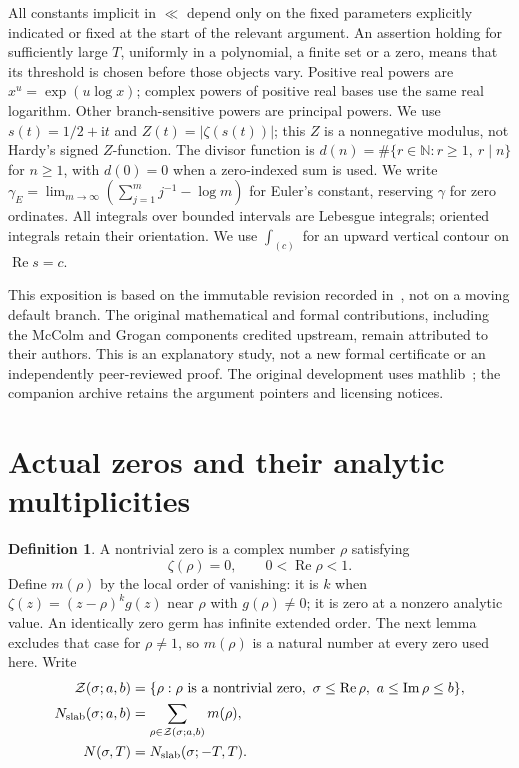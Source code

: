 \documentclass[11pt,a4paper]{article}
\numberwithin{equation}{section}
\theoremstyle{definition}
\newtheorem{definition}[theorem]{Definition}
\newcommand{\N}{\mathbb N}
\newcommand{\ii}{\mathrm i}
\newcommand{\Rea}{\operatorname{Re}}
\newcommand{\Ima}{\operatorname{Im}}
\begin{document}
All constants implicit in $\ll$ depend only on the fixed parameters
explicitly indicated or fixed at the start of the relevant argument.
An assertion holding for sufficiently large $T$, uniformly in a polynomial,
a finite set or a zero, means that its threshold is chosen before those
objects vary. Positive real powers are $x^u=\exp(u\log x)$; complex powers
of positive real bases use the same real logarithm. Other branch-sensitive
powers are principal powers. We use $s(t)=1/2+\ii t$ and
$Z(t)=|\zeta(s(t))|$; this $Z$ is a nonnegative modulus, not Hardy's signed
$Z$-function. The divisor function is
$d(n)=\#\{r\in\N:r\ge1,\ r\mid n\}$ for $n\ge1$, with $d(0)=0$
when a zero-indexed sum is used. We write
$\gamma_E=\lim_{m\to\infty}(\sum_{j=1}^m j^{-1}-\log m)$
for Euler's constant, reserving $\gamma$ for zero ordinates. All integrals over bounded intervals
are Lebesgue integrals; oriented integrals retain their orientation.
We use $\int_{(c)}$ for an upward vertical contour on $\Rea s=c$.

This exposition is based on the immutable revision recorded
in~\cite{source,registry}, not on a moving default branch.
The original mathematical and formal contributions, including the
McColm and Grogan components credited upstream, remain attributed to
their authors. This is an explanatory study, not a new formal certificate
or an independently peer-reviewed proof. The original development uses
mathlib~\cite{mathlib}; the companion archive retains the argument pointers
and licensing notices.

\section{Actual zeros and their analytic multiplicities}
\label{sec:zeros}
\begin{definition}
A nontrivial zero is a complex number $\rho$ satisfying
\[
 \zeta(\rho)=0,\qquad 0<\Rea\rho<1.
\]
Define $m(\rho)$ by the local order of vanishing: it is $k$ when
$\zeta(z)=(z-\rho)^k g(z)$ near $\rho$ with $g(\rho)\ne0$; it is zero
at a nonzero analytic value. An identically zero germ has infinite extended
order. The next lemma excludes that case for $\rho\ne1$, so $m(\rho)$
is a natural number at every zero used here. Write
\begin{align*}
 \mathcal Z(\sigma;a,b)&=\{\rho:\rho\text{ is a nontrivial zero},\
  \sigma\le\Rea\rho,\ a\le\Ima\rho\le b\},\\
 N_{\rm slab}(\sigma;a,b)&=\sum_{\rho\in\mathcal Z(\sigma;a,b)}m(\rho),\\
 N(\sigma,T)&=N_{\rm slab}(\sigma;-T,T).
\end{align*}
\end{definition}
\end{document}
